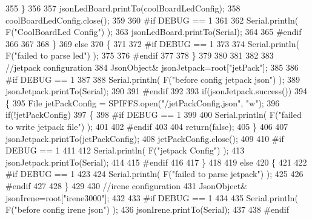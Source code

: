 \begin{DoxyCode}
355         \}
356         
357         jsonLedBoard.printTo(coolBoardLedConfig);
358         coolBoardLedConfig.close();
359 
360 \textcolor{preprocessor}{    #if DEBUG == 1 }
361 
362         Serial.println( F(\textcolor{stringliteral}{"CoolBoardLed Config"}) );     
363         jsonLedBoard.printTo(Serial);
364     
365 \textcolor{preprocessor}{    #endif}
366 
367     
368     \}
369     \textcolor{keywordflow}{else}
370     \{
371     
372 \textcolor{preprocessor}{    #if DEBUG == 1 }
373 
374         Serial.println( F(\textcolor{stringliteral}{"failed to parse led"}) );
375     
376 \textcolor{preprocessor}{    #endif }
377 
378     \}
379         
380 
381     
382 
383     \textcolor{comment}{//jetpack configuration}
384         JsonObject& jsonJetpack=root[\textcolor{stringliteral}{"jetPack"}];
385 
386 \textcolor{preprocessor}{#if DEBUG == 1 }
387 
388     Serial.println( F(\textcolor{stringliteral}{"before config jetpack json"}) );
389     jsonJetpack.printTo(Serial);
390 
391 \textcolor{preprocessor}{#endif}
392 
393     \textcolor{keywordflow}{if}(jsonJetpack.success())
394     \{   
395         File jetPackConfig = SPIFFS.open(\textcolor{stringliteral}{"/jetPackConfig.json"}, \textcolor{stringliteral}{"w"});   
396         \textcolor{keywordflow}{if}(!jetPackConfig)
397         \{
398 \textcolor{preprocessor}{        #if DEBUG == 1}
399 
400             Serial.println( F(\textcolor{stringliteral}{"failed to write jetpack file"}) );
401         
402 \textcolor{preprocessor}{        #endif}
403 
404             \textcolor{keywordflow}{return}(\textcolor{keyword}{false});
405         \}
406 
407         jsonJetpack.printTo(jetPackConfig);
408         jetPackConfig.close();
409 
410 \textcolor{preprocessor}{    #if DEBUG == 1}
411 
412         Serial.println( F(\textcolor{stringliteral}{"jetpack Config"}) );  
413         jsonJetpack.printTo(Serial);
414     
415 \textcolor{preprocessor}{    #endif}
416 
417     \}
418 
419     \textcolor{keywordflow}{else}
420     \{
421     
422 \textcolor{preprocessor}{    #if DEBUG == 1 }
423 
424         Serial.println( F(\textcolor{stringliteral}{"failed to parse jetpack"}) ); 
425     
426 \textcolor{preprocessor}{    #endif}
427 
428     \}
429     
430     \textcolor{comment}{//irene configuration   }
431         JsonObject& jsonIrene=root[\textcolor{stringliteral}{"irene3000"}];
432     
433 \textcolor{preprocessor}{#if DEBUG == 1 }
434 
435     Serial.println( F(\textcolor{stringliteral}{"before config irene json"}) );    
436     jsonIrene.printTo(Serial);
437 
438 \textcolor{preprocessor}{#endif }

\end{DoxyCode}
